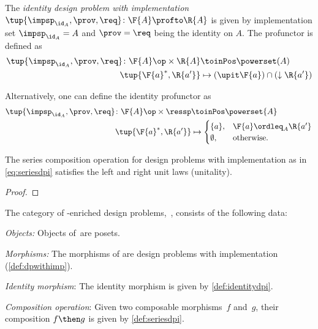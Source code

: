 {    \begin{definition}
        \label{def:identitydpi}
        The \emph{identity design problem with implementation}~$\tup{\impsp_{\id_A},\prov,\req} \colon \F{A} \profto \R{A}$ is given by implementation set $\impsp_{\id_A} = A$ and $\prov=\req$ being
        the identity on $A$. The profunctor is defined as
        \begin{align}
            \tup{\impsp_{\id_A},\prov,\req} \colon \F{A}\op \times \R{A} &\toinPos \powerset(A) \\
            \tup{\F{a}^*,\R{a'}} &\mapsto (\upit \F{a}) \cap (\downarrow \R{a'})
        \end{align}
    \end{definition}
    \begin{remark}
        Alternatively, one can define the identity profunctor as
        \begin{align}
            \tup{\impsp_{\id_A},\prov,\req}\colon \F{A}\op \times \ressp &\toinPos \powerset{A}\\
            \tup{\F{a}^*,\R{a'}}&\mapsto
            \begin{cases}
                \{a\},&\F{a}\ordleq_A \R{a'}\\
                \emptyset, &\text{otherwise}.
            \end{cases}
        \end{align}
    \end{remark}

    \begin{lemma}
        The series composition operation for design problems with implementation as in \cref{eq:seriesdpi} satisfies the left and right unit laws (unitality).
    \end{lemma}

    \begin{proof}
    \end{proof}


    \begin{definition}
        The category of \Set-enriched design problems,~\DPI, consists of the following data:
        \begin{compactenum}
            \item \emph{Objects:}  Objects of~\DPI are posets.
            \item \emph{Morphisms:} The morphisms of \DPI are design problems with implementation (\cref{def:dpwithimp}).
            \item \emph{Identity morphism}: The identity morphism is given by \cref{def:identitydpi}.
            \item \emph{Composition operation}: Given two composable morphisms~$f$ and~$g$, their composition $f\then g$ is given by \cref{def:seriesdpi}.
        \end{compactenum}
    \end{definition}

}

